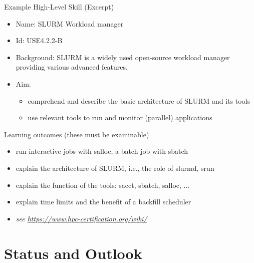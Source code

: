 \documentclass[compress,aspectratio=169]{beamer}
\begin{document}
\begin{frame}{Example High-Level Skill (Excerpt)}
\begin{itemize}
\item Name: SLURM Workload manager
\item Id: USE4.2.2-B
\item Background: {\small SLURM is a widely used open-source workload
manager providing various advanced features.}
\item Aim:
\begin{itemize}
\item comprehend and describe the basic architecture of SLURM and its tools
\item use relevant tools to run and monitor (parallel) applications
\end{itemize}
\end{itemize}

\begin{block}{Learning outcomes (these must be examinable)}
\begin{itemize}
\item run interactive jobs with salloc, a batch job with sbatch
\item explain the architecture of SLURM, i.e., the role of slurmd, srun
\item explain the function of the tools: sacct, sbatch, salloc, ...
\item explain time limits and the benefit of a backfill scheduler
\item \textit{see \url{https://www.hpc-certification.org/wiki/}}
\end{itemize}
\end{block}
\end{frame}



\section{Status and Outlook}
\sectionIntroHidden
\end{document}
